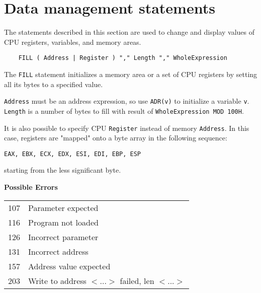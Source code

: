 \section{Data management statements}

The statements described in this section are used to change and display
values of CPU registers, variables, and memory areas.

{\samepage
{}\label{batch:FILL}
\begin{verbatim}
    FILL ( Address | Register ) "," Length "," WholeExpression
\end{verbatim}
The \verb'FILL' statement initializes a memory area or a set of
CPU registers by setting all its bytes to a specified value.
} %

\verb'Address' must be an address expression, so use \verb'ADR(v)'
to initialize a variable \verb'v'. \verb'Length' is a number of
bytes to fill with result of \verb'WholeExpression MOD 100H'.

It is also possible to specify CPU \verb'Register' instead of
memory \verb'Address'. In this case, registers are "mapped" onto
a byte array in the following sequence:

\verb'EAX, EBX, ECX, EDX, ESI, EDI, EBP, ESP'

starting from the less significant byte.

{\samepage
{\bf Possible Errors}
\begin{flushleft}
\begin{tabular}{ll}
107 & Parameter expected \\
116 & Program not loaded \\
126 & Incorrect parameter \\
131 & Incorrect address \\
157 & Address value expected \\
203 & Write to address $<$...$>$ failed, len $<$...$>$
\end{tabular}
\end{flushleft}
} %
{} %


